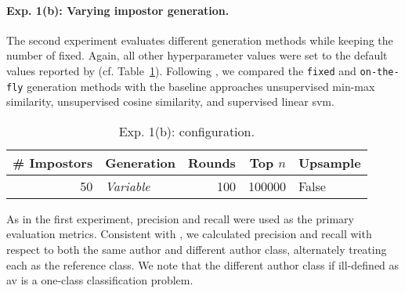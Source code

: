 \paragraph{Exp. 1(b): Varying impostor generation.}
The second experiment evaluates different \imp{} generation methods while keeping the number of \imps{} fixed.
Again, all other hyperparameter values were set to the default values reported by \citet{koppel_determining_2014} (cf. Table~\ref{tab:repr_exp2}). 
Following \citet{koppel_determining_2014}, we compared the \texttt{fixed} and \texttt{on-the-fly} \imp{} generation methods with the baseline approaches unsupervised min-max similarity, unsupervised cosine similarity, and supervised linear \ac{svm}.

\begin{table}[h]
\centering\small
\caption{Exp. 1(b): \impAppr{} configuration.}
\label{tab:repr_exp2}
\begin{tabular}{@{}rlrrl@{}}   %
\toprule
\# Impostors & Generation & Rounds & Top $n$ & Upsample \\
\midrule
50 & \textit{Variable} & 100 & \num{100000} & False \\
\bottomrule
\end{tabular}%
\end{table}

As in the first experiment, precision and recall were used as the primary evaluation metrics. 
Consistent with \citet{koppel_determining_2014}, we calculated precision and recall with respect to both the same author and different author class, alternately treating each as the reference class.
We note that the different author class if ill-defined as \ac{av} is a one-class classification problem.

